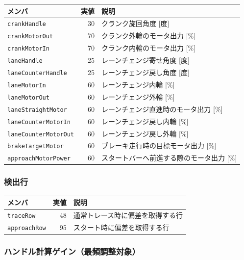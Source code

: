 \documentclass[a4paper,11pt,dvipdfmx]{jsarticle}
\begin{document}
\begin{tabularx}{\textwidth}{l r X}
\toprule
\textbf{メンバ} & \textbf{実値} & \textbf{説明} \\
\midrule
\texttt{crankHandle}         & 30 & クランク旋回角度 [度] \\
\texttt{crankMotorOut}       & 70 & クランク外輪のモータ出力 [\%] \\
\texttt{crankMotorIn}        & 70 & クランク内輪のモータ出力 [\%] \\
\texttt{laneHandle}          & 25 & レーンチェンジ寄せ角度 [度] \\
\texttt{laneCounterHandle}   & 25 & レーンチェンジ戻し角度 [度] \\
\texttt{laneMotorIn}         & 60 & レーンチェンジ内輪 [\%] \\
\texttt{laneMotorOut}        & 60 & レーンチェンジ外輪 [\%] \\
\texttt{laneStraightMotor}   & 60 & レーンチェンジ直進時のモータ出力 [\%] \\
\texttt{laneCounterMotorIn}  & 60 & レーンチェンジ戻し内輪 [\%] \\
\texttt{laneCounterMotorOut} & 60 & レーンチェンジ戻し外輪 [\%] \\
\texttt{brakeTargetMotor}    & 60 & ブレーキ走行時の目標モータ出力 [\%] \\
\texttt{approachMotorPower}  & 60 & スタートバーへ前進する際のモータ出力 [\%] \\
\bottomrule
\end{tabularx}

\subsubsection{検出行}

\begin{tabularx}{\textwidth}{l r X}
\toprule
\textbf{メンバ} & \textbf{実値} & \textbf{説明} \\
\midrule
\texttt{traceRow}    & 48 & 通常トレース時に偏差を取得する行 \\
\texttt{approachRow} & 95 & スタート時に偏差を取得する行 \\
\bottomrule
\end{tabularx}

\subsubsection{ハンドル計算ゲイン（最頻調整対象）}
\end{document}

